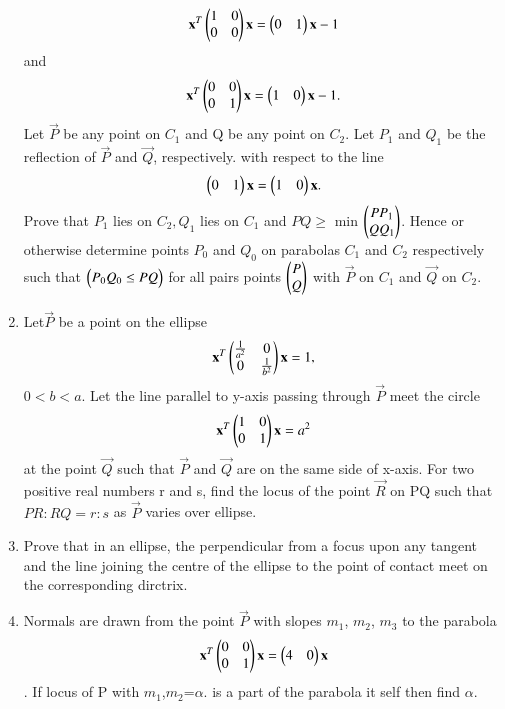 \documentclass[journal,12pt,twocolumn]{IEEEtran}
\begin{document}
\begin{enumerate}[label=\arabic*]
    \begin{align}
    \mathbf{x}^T\begin{pmatrix}1&0\\0&0\end{pmatrix}\mathbf{x}=\begin{pmatrix}0&1\end{pmatrix}\mathbf{x}-1
    \end{align} and
    \begin{align}
    \mathbf{x}^T\begin{pmatrix}0&0\\0&1\end{pmatrix}\mathbf{x}=\begin{pmatrix}1&0\end{pmatrix}\mathbf{x}-1.
    \end{align} Let $\vec{P}$ be any point on $C_1$ and Q be any point on $C_2$. Let $P_1$ and 
    $Q_1$ be the reflection of $\vec{P}$ and $\vec{Q}$, respectively. with respect to the line 
    \begin{align}
    \begin{pmatrix}0&1\end{pmatrix}\mathbf{x}=\begin{pmatrix}1&0\end{pmatrix}\mathbf{x}.
    \end{align} Prove that $P_1$ lies on $C_2, Q_1$ lies on $C_1$ and $P Q \geq$ min 
    $\begin{pmatrix}PP_1\\QQ_1\end{pmatrix}$. Hence or otherwise determine points $P_0$ and $Q_0$ on parabolas $C_1$ and 		$C_2$ respectively such that $\begin{pmatrix}P_0 Q_0 \leq PQ\end{pmatrix}$ for all pairs points $\begin{pmatrix}P\\Q\end{pmatrix}$ with 
    $\vec{P}$ on $C_1$ and $\vec{Q}$ on $C_2$.
    \item Let$\vec{P}$ be a point on the ellipse
    \begin{align}
    \mathbf{x}^T\begin{pmatrix}\frac{1}{a^2}&0\\0&\frac{1}{b^2}\end{pmatrix}\mathbf{x}=1,
    \end{align} $0<b<a$. Let the line parallel to y-axis passing through $\vec{P}$ meet the circle
    \begin{align}
    \mathbf{x}^T\begin{pmatrix}1&0\\0&1\end{pmatrix}\mathbf{x}=a^2
    \end{align} at the point $\vec{Q}$ such that $\vec{P}$ and $\vec{Q}$ are on the same side of 
    x-axis. For two positive real numbers r and s, find the locus of the point $\vec{R}$ on 
    PQ such that $PR:RQ=r:s$ as $\vec{P}$ varies over ellipse.
    \item Prove that in an ellipse, the perpendicular from a focus upon any tangent and the line joining the centre of the ellipse to the point of contact meet on the corresponding dirctrix.
    \item Normals are drawn from the point $\vec{P}$ with slopes $m_1$, $m_2$, $m_3$ to the parabola
    \begin{align}
    \mathbf{x}^T\begin{pmatrix}0&0\\0&1\end{pmatrix}\mathbf{x}=\begin{pmatrix}4&0\end{pmatrix}\mathbf{x}
    \end{align}. If locus of P with $m_1$,$m_2$=$\alpha$. is a part of the parabola it self then find $\alpha$.

\end{enumerate}
\end{document}
